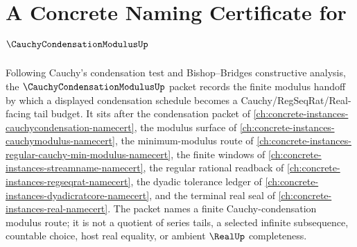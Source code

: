\chapter{A Concrete Naming Certificate for $\CauchyCondensationModulusUp$}
\label{ch:concrete-instances-cauchy-condensation-modulus-namecert}

Following Cauchy's condensation test and Bishop--Bridges constructive analysis, the $\CauchyCondensationModulusUp$ packet records the finite modulus handoff by which a displayed condensation schedule becomes a Cauchy/RegSeqRat/Real-facing tail budget. It sits after the condensation packet of \autoref{ch:concrete-instances-cauchycondensation-namecert}, the modulus surface of \autoref{ch:concrete-instances-cauchymodulus-namecert}, the minimum-modulus route of \autoref{ch:concrete-instances-regular-cauchy-min-modulus-namecert}, the finite windows of \autoref{ch:concrete-instances-streamname-namecert}, the regular rational readback of \autoref{ch:concrete-instances-regseqrat-namecert}, the dyadic tolerance ledger of \autoref{ch:concrete-instances-dyadicratcore-namecert}, and the terminal real seal of \autoref{ch:concrete-instances-real-namecert}. The packet names a finite Cauchy-condensation modulus route; it is not a quotient of series tails, a selected infinite subsequence, countable choice, host real equality, or ambient $\RealUp$ completeness.

